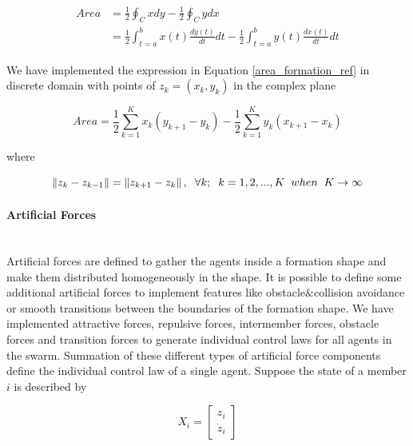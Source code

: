 \begin{align} \label{area_formation_ref}
\begin{split}
Area &= \frac{1}{2} \oint_C xdy - \frac{1}{2} \oint_C ydx \\
&= \frac{1}{2} \int_{t=a}^{b} x(t)\frac{dy(t)}{dt}dt - \frac{1}{2} \int_{t=a}^{b}y(t)\frac{dx(t)}{dt}dt
\end{split}
\end{align}
		
We have implemented the expression in Equation \ref{area_formation_ref} in discrete domain with points of  $z_k = (x_k,y_k)$ in the complex plane
			
\begin{equation}
Area = \frac{1}{2} \sum_{k=1}^{K} x_k(y_{k+1} - y_k) - \frac{1}{2} \sum_{k=1}^{K}y_k(x_{k+1} - x_k)
\end{equation}
			
where

\begin{equation}
\left\lVert z_k - z_{k-1}\right\rVert = \left\lVert z_{k+1} - z_k\right\rVert, \hspace{0.2cm}  \forall k ;  \hspace{0.2cm} k=1,2,...,K \hspace{0.2cm} when  \hspace{0.2cm} K \to\infty
\end{equation}

\paragraph{Artificial Forces}\hspace{0pt} \\ 
Artificial forces are defined to gather the agents inside a formation shape and make them distributed homogeneously in the shape. It is possible to define some additional artificial forces to implement features like obstacle$\&$collision avoidance or smooth transitions between the boundaries of the formation shape. We have implemented attractive forces, repulsive forces, intermember forces, obstacle forces and transition forces to generate individual control laws for all agents in the swarm. Summation of these different types of artificial force components define the individual control law of a single agent. Suppose the state of a member $i$ is described by

\begin{equation}
X_i = \begin{bmatrix}
z_i\\ \dot{z}_i
\end{bmatrix}
\end{equation}

